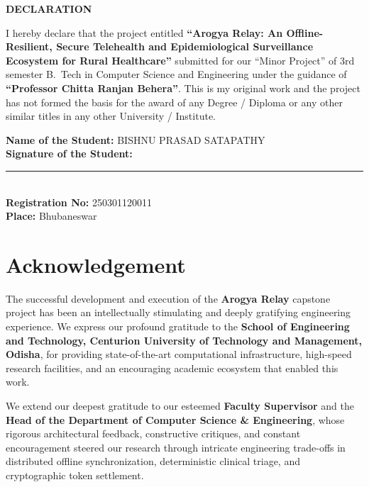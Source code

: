 \documentclass[12pt,a4paper,oneside]{report}
\begin{document}
\clearpage

\thispagestyle{plain}

\begin{center}
    {\fontsize{16}{20}\selectfont \bfseries DECLARATION}
\end{center}
\vspace{1.0cm}

{\fontsize{13}{20}\selectfont
\noindent I hereby declare that the project entitled \textbf{``Arogya Relay: An Offline-Resilient, Secure Telehealth and Epidemiological Surveillance Ecosystem for Rural Healthcare''} submitted for our ``Minor Project'' of 3rd semester B.~Tech in Computer Science and Engineering under the guidance of \textbf{``Professor Chitta Ranjan Behera''}. This is my original work and the project has not formed the basis for the award of any Degree / Diploma or any other similar titles in any other University / Institute.
}

\vspace{3.5cm}

\noindent
{\fontsize{13}{22}\selectfont
\textbf{Name of the Student:} BISHNU PRASAD SATAPATHY \\[0.4cm]
\textbf{Signature of the Student:} \rule{5.5cm}{0.4pt} \\[0.4cm]
\textbf{Registration No:} 250301120011 \\[0.4cm]
\textbf{Place:} Bhubaneswar
}

\clearpage
\chapter*{Acknowledgement}

The successful development and execution of the \textbf{Arogya Relay} capstone project has been an intellectually stimulating and deeply gratifying engineering experience. We express our profound gratitude to the \textbf{School of Engineering and Technology, Centurion University of Technology and Management, Odisha}, for providing state-of-the-art computational infrastructure, high-speed research facilities, and an encouraging academic ecosystem that enabled this work.

\vspace{0.4cm}
We extend our deepest gratitude to our esteemed \textbf{Faculty Supervisor} and the \textbf{Head of the Department of Computer Science \& Engineering}, whose rigorous architectural feedback, constructive critiques, and constant encouragement steered our research through intricate engineering trade-offs in distributed offline synchronization, deterministic clinical triage, and cryptographic token settlement.
\end{document}
